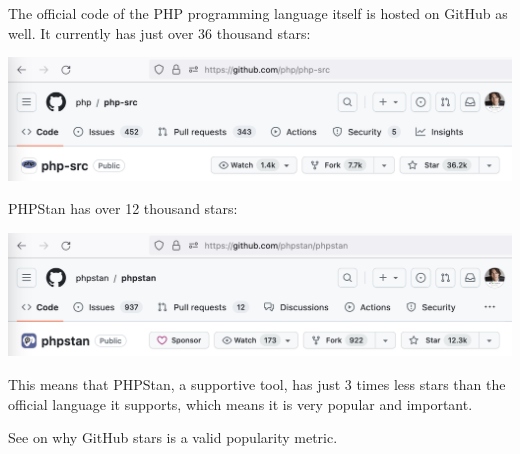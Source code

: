 
The official code of the PHP programming language itself is hosted on GitHub as well.
It currently has just over 36 thousand stars:

\includegraphics[width=\textwidth]{php}

PHPStan has over 12 thousand stars:

\includegraphics[width=\textwidth]{phpstan}

This means that PHPStan, a supportive tool, has just 3 times less stars
than the official language it supports, which means it is very popular and important.

See  on why GitHub stars is a valid popularity metric.

\pagebreak
